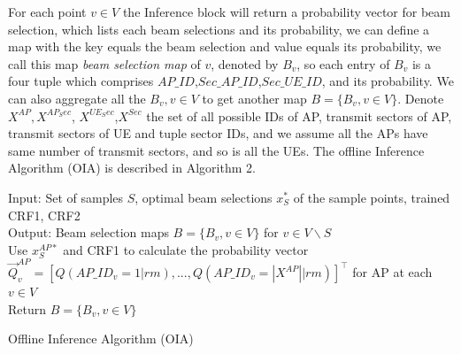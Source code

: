 \documentclass[conference]{IEEEtran}
\begin{document}
For each point $v\in V$ the Inference block will return a probability vector for beam selection, which lists each beam selections and its probability, we can define a map with the key equals the beam selection and value equals its probability, we call this map \emph{beam selection map} of $v$, denoted by $B_{v}$, so each entry of $B_{v}$ is a four tuple which comprises  $AP\_ID$,$Sec\_AP\_ID$,$Sec\_UE\_ID$, and its probability. We can also aggregate all the $B_{v}, v\in V$ to get another map $B = \{B_{v},v\in V\}$. Denote $X^{AP}, X^{AP_Sec}$, $X^{UE_Sec}$,$X^{Sec}$ the set of all possible IDs of AP, transmit sectors of AP, transmit sectors of UE and tuple sector IDs, and we assume all the APs have same number of transmit sectors, and so is all the UEs. The offline Inference Algorithm (OIA) is described in Algorithm 2.
\begin{algorithm}[H]
	Input: Set of samples $S$, optimal beam selections $x_{S}^{*}$ of the sample points, trained CRF1, CRF2 \\
	Output: Beam selection maps $B=\{B_{v},v\in V\}$ for $v\in V\backslash S$ \\
	Use $x^{AP*}_{S}$ and CRF1 to calculate the probability vector $\vec{Q}^{AP}_{v}=[Q(AP\_ID_{v}=1|rm),...,Q(AP\_ID_{v}=|X^{AP}||rm)]^\top$ for AP at each $v\in V$\\
	Return $B=\{B_{v},v\in V\}$
	\caption{Offline Inference Algorithm (OIA)}
\end{algorithm}
\end{document}
